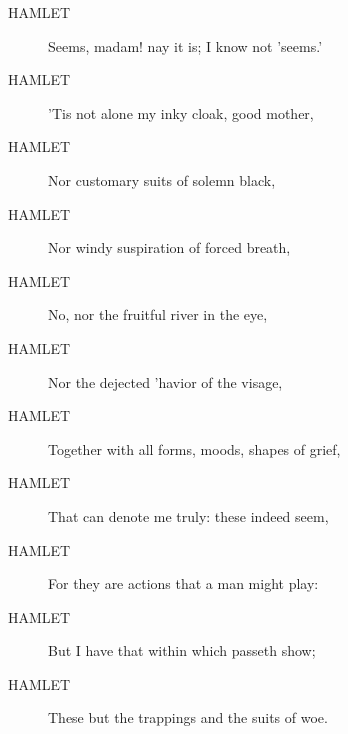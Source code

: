 \documentclass{article}
\begin{document}
\begin{description}
            
\item[HAMLET] Seems, madam! nay it is; I know not 'seems.'
\item[HAMLET] 'Tis not alone my inky cloak, good mother,
\item[HAMLET] Nor customary suits of solemn black,
\item[HAMLET] Nor windy suspiration of forced breath,
\item[HAMLET] No, nor the fruitful river in the eye,
\item[HAMLET] Nor the dejected 'havior of the visage,
\item[HAMLET] Together with all forms, moods, shapes of grief,
\item[HAMLET] That can denote me truly: these indeed seem,
\item[HAMLET] For they are actions that a man might play:
\item[HAMLET] But I have that within which passeth show;
\item[HAMLET] These but the trappings and the suits of woe.
\end{description}
          
\end{document}
